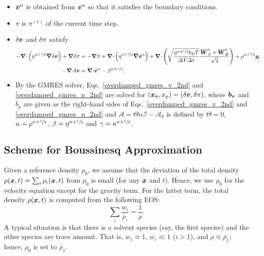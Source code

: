 \documentclass[
10pt
showpacs, showkeys,
amsmath,amssymb,
aps,
pre,
floatfix,
]{revtex4-1}
\newcommand{\divg}{{\V\nabla\cdot}}                       %
\newcommand{\paren}[1]{{(#1)}}                            %
\begin{document}
\begin{enumerate}
\begin{itemize}
\item $\bar{\boldsymbol{v}}^n$ is obtained from $\boldsymbol{v}^n$ so that it satisfies the boundary conditions.
\item $\pi$ is $\pi^\paren{1}$ of the current time step.
\item $\delta\boldsymbol{v}$ and $\delta\pi$ satisfy
\begin{align}
\label{overdamped_gmres_v_2nd}
-\divg\left(\eta^{n+\myhalf}\overline{\grad}\d{\V{v}}\right) + \grad\d{\pi}
& = -\grad\pi +\divg\left( \eta^{n+\myhalf} \overline{\grad}\bar{\V{v}}^n \right)
+ \divg\left( \sqrt{\frac{\eta^{n+\myhalf} k_\mathrm{B}T}{\D{V}\D{t}} } \frac{\overline{\V{W}}^n_A + \overline{\V{W}}^n_B}{\sqrt{2}} \right) + \rho^{n+\myhalf}\V{g}, \\
\label{overdamped_gmres_p_2nd}
-\divg\d{\V{v}} & = \divg\bar{\V{v}}^n-S^{n+\myhalf}.
\end{align}
\item By the GMRES solver, Eqs.~\eqref{overdamped_gmres_v_2nd} and \eqref{overdamped_gmres_p_2nd} are solved for $(\boldsymbol{x}_{\boldsymbol{v}},x_p)=(\delta\boldsymbol{v},\delta\pi)$, where $\boldsymbol{b}_{\boldsymbol{v}}$ and $b_p$ are given as the right-hand sides of Eqs.~\eqref{overdamped_gmres_v_2nd} and \eqref{overdamped_gmres_p_2nd} and $\mathcal{A}=\Theta\alpha\mathcal{I}-\mathcal{A}_0$ is defined by $\Theta=0$, $\alpha=\rho^{n+\sfrac{1}{2}}$, $\beta=\eta^{n+\sfrac{1}{2}}$ and $\gamma=\kappa^{n+\sfrac{1}{2}}$.
\end{itemize}

\end{enumerate}



\clearpage



\subsection{Scheme for Boussinesq Approximation}

Given a reference density $\rho_0$, we assume that the deviation of the total density $\rho(\boldsymbol{x},t) = \sum_i \rho_i(\boldsymbol{x},t)$ from $\rho_0$ is small (for any $\boldsymbol{x}$ and $t$).
Hence, we use $\rho_0$ for the velocity equation except for the gravity term.
For the latter term, the total density $\rho(\boldsymbol{x},t)$ is computed from the following EOS:
\begin{equation}
\sum_i \frac{w_i}{\bar{\rho}_i} = \frac{1}{\rho}.
\end{equation}
A typical situation is that there is a solvent species (say, the first species) and the other species are trace amount.
That is, $w_1\approx 1$, $w_i\ll 1$ ($i>1$), and $\rho\approx\bar{\rho}_1$; hence, $\rho_0$ is set to $\bar{\rho}_1$.
\end{document}

